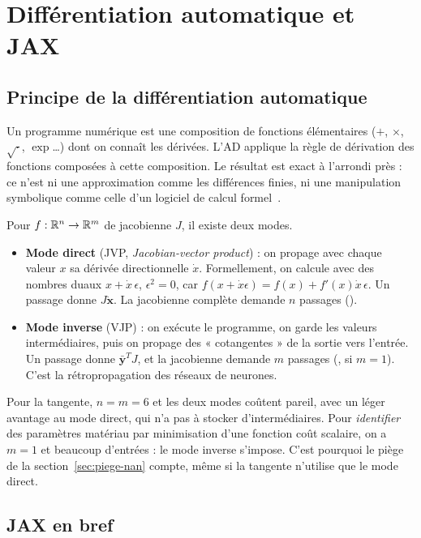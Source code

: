 \section{Différentiation automatique et JAX}\label{sec:jax}

\subsection{Principe de la différentiation automatique}

Un programme numérique est une composition de fonctions élémentaires ($+$, $\times$, $\sqrt{\cdot}$, $\exp$\ldots) dont on connaît les dérivées. L'AD applique la règle de dérivation des fonctions composées à cette composition. Le résultat est exact à l'arrondi près : ce n'est ni une approximation comme les différences finies, ni une manipulation symbolique comme celle d'un logiciel de calcul formel~\cite{griewank2008}.

Pour $f:\mathbb{R}^n\to\mathbb{R}^m$ de jacobienne $J$, il existe deux modes.
\begin{itemize}[nosep]
  \item \textbf{Mode direct} (JVP, \emph{Jacobian-vector product}) : on propage avec chaque valeur $x$ sa dérivée directionnelle $\dot x$. Formellement, on calcule avec des nombres duaux $x+\dot x\,\epsilon$, $\epsilon^2=0$, car $f(x+\dot x\epsilon)=f(x)+f'(x)\dot x\,\epsilon$. Un passage donne $J\dot{\mathbf{x}}$. La jacobienne complète demande $n$ passages ().
  \item \textbf{Mode inverse} (VJP) : on exécute le programme, on garde les valeurs intermédiaires, puis on propage des « cotangentes » de la sortie vers l'entrée. Un passage donne $\bar{\mathbf{y}}^TJ$, et la jacobienne demande $m$ passages (,  si $m=1$). C'est la rétropropagation des réseaux de neurones.
\end{itemize}
Pour la tangente, $n=m=6$ et les deux modes coûtent pareil, avec un léger avantage au mode direct, qui n'a pas à stocker d'intermédiaires. Pour \emph{identifier} des paramètres matériau par minimisation d'une fonction coût scalaire, on a $m=1$ et beaucoup d'entrées : le mode inverse s'impose. C'est pourquoi le piège de la section~\ref{sec:piege-nan} compte, même si la tangente n'utilise que le mode direct.

\subsection{JAX en bref}

